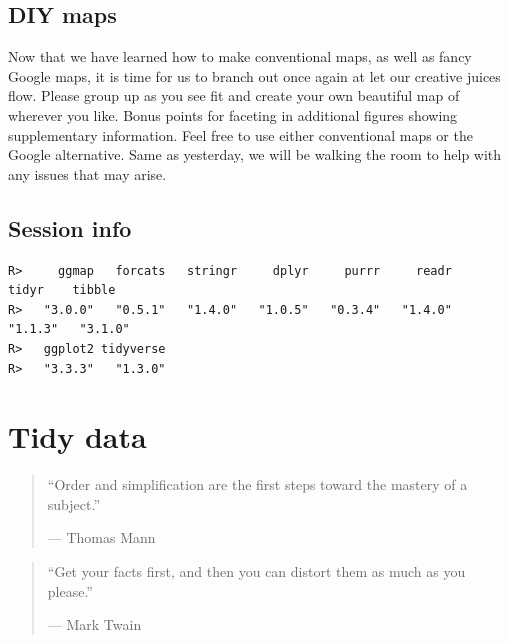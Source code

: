 \documentclass[
]{book}
\newenvironment{Shaded}{\begin{snugshade}}{\end{snugshade}}
\newcommand{\FunctionTok}[1]{\textcolor[rgb]{0.00,0.00,0.00}{#1}}
\newcommand{\NormalTok}[1]{#1}
\newcommand{\SpecialCharTok}[1]{\textcolor[rgb]{0.00,0.00,0.00}{#1}}
\newcommand{\StringTok}[1]{\textcolor[rgb]{0.31,0.60,0.02}{#1}}
\begin{document}
\hypertarget{diy-maps}{%
\section{DIY maps}\label{diy-maps}}

Now that we have learned how to make conventional maps, as well as fancy Google maps, it is time for us to branch out once again at let our creative juices flow. Please group up as you see fit and create your own beautiful map of wherever you like. Bonus points for faceting in additional figures showing supplementary information. Feel free to use either conventional maps or the Google alternative. Same as yesterday, we will be walking the room to help with any issues that may arise.

\hypertarget{session-info-7}{%
\section{Session info}\label{session-info-7}}

\begin{Shaded}
\end{Shaded}

\begin{verbatim}
R>     ggmap   forcats   stringr     dplyr     purrr     readr     tidyr    tibble 
R>   "3.0.0"   "0.5.1"   "1.4.0"   "1.0.5"   "0.3.4"   "1.4.0"   "1.1.3"   "3.1.0" 
R>   ggplot2 tidyverse 
R>   "3.3.3"   "1.3.0"
\end{verbatim}

\hypertarget{tidy}{%
\chapter{Tidy data}\label{tidy}}

\begin{quote}
``Order and simplification are the first steps toward the mastery of a subject.''

--- Thomas Mann
\end{quote}

\begin{quote}
``Get your facts first, and then you can distort them as much as you please.''

--- Mark Twain
\end{quote}
\end{document}
